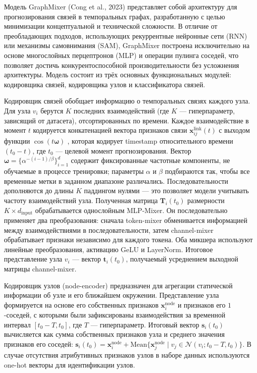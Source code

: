 \documentclass[a4paper,12pt]{extarticle}
\begin{document}
Модель GraphMixer (Cong et al., 2023) представляет собой архитектуру для прогнозирования связей в темпоральных графах, разработанную с целью минимизации концептуальной и технической сложности. В отличие от преобладающих подходов, использующих рекуррентные нейронные сети (RNN) или механизмы самовнимания (SAM), GraphMixer построена исключительно на основе многослойных перцептронов (MLP) и операции пулинга соседей, что позволяет достичь конкурентоспособной производительности без усложнения архитектуры. Модель состоит из трёх основных функциональных модулей: кодировщика связей, кодировщика узлов и классификатора связей.

Кодировщик связей обобщает информацию о темпоральных связях каждого узла.
Для узла \(v_i\) берутся \(K\) последних взаимодействий (где \(K\) ---
гиперпараметр, зависящий от датасета), отсортированных по времени. Каждое
взаимодействие в момент \(t\) кодируется конкатенацией вектора признаков связи
\(\mathbf{x}_{ij}^{\text{link}}(t)\) с выходом функции \(\cos(t\boldsymbol{\omega})\)
, которая кодирует timestamp относительного времени \((t_0 - t)\), где \(t_0\) ---
целевой момент прогнозирования. Вектор \(\boldsymbol{\omega} =
\{\alpha^{-(i-1)/\beta}\}_{i=1}^{d}\) содержит фиксированные частотные компоненты,
не обучаемые в процессе тренировки; параметры \(\alpha\) и \(\beta\) подбираются
так, чтобы все временные метки в заданном диапазоне различались. Последовательности
дополняются до длины \(K\) паддингом нулями --- это позволяет модели учитывать
частоту взаимодействий узла. Полученная матрица \(\mathbf{T}_i(t_0)\) размерности
\(K \times d_{\text{input}}\) обрабатывается однослойным MLP-Mixer. Он последовательно
применяет два преобразования: сначала token-mixer обменивается информацией между
взаимодействиями в последовательности, затем channel-mixer обрабатывает признаки
независимо для каждого токена. Оба микшера используют линейные преобразования,
активацию GeLU и LayerNorm. Итоговое представление узла \(v_i\) ---
вектор \(\mathbf{t}_i(t_0)\), получаемый усреднением выходной матрицы channel-mixer.

Кодировщик узлов (node-encoder) предназначен для агрегации статической информации об узле и его ближайшем окружении. Представление узла формируется на основе его собственных признаков \(\mathbf{x}_i^{\text{node}}\) и признаков его \(1\)-соседей, с которыми были зафиксированы взаимодействия за временной интервал \([t_0 - T, t_0]\), где \(T\) — гиперпараметр. Итоговый вектор \(\mathbf{s}_i(t_0)\) вычисляется как сумма собственных признаков узла и среднего значения признаков его соседей: \(\mathbf{s}_i(t_0) = \mathbf{x}_i^{\text{node}} + \text{Mean}\{\mathbf{x}_j^{\text{node}} \mid v_j \in \mathcal{N}(v_i; t_0 - T, t_0)\}\). В случае отсутствия атрибутивных признаков узлов в наборе данных используются one-hot векторы для идентификации узлов.
\end{document}
